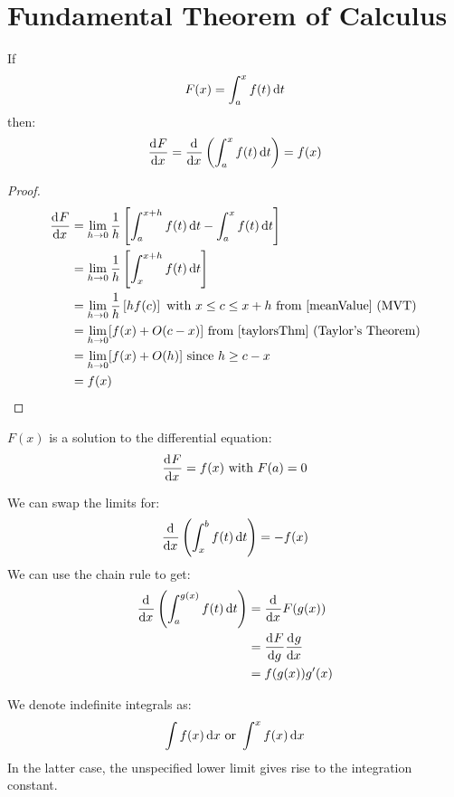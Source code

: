 \documentclass[../main.tex]{subfiles}
\begin{document}
\section{Fundamental Theorem of Calculus}
\begin{theorem}
  If
  \[
    F(x) = \int_{a}^{x} f(t) \,\mathrm{d} t
  \]
  then:
  \[
    \deriv{F}{x} = \deriv{}{x}\left(\int_{a}^{x} f(t) \d{t}\right) = f(x)
  \]
\end{theorem}
\begin{proof}
  \begin{align*}
    \deriv{F}{x} &= \lim_{h \to 0} \frac{1}{h} \left[\int_{a}^{x+h} f(t) \d{t} - \int_{a}^{x} f(t) \d{t}\right] \\
                 &= \lim_{h \to 0} \frac{1}{h} \left[\int_{x}^{x+h} f(t) \d{t}\right] \\
                 &= \lim_{h \to 0} \frac{1}{h} \left[hf(c)\right] \text{ with } x \leq c \leq x + h \text{ from \cref{meanValue} (MVT)} \\
                 &= \lim_{h \to 0} [f(x) + O(c-x)] \text{ from \cref{taylorsThm} (Taylor's Theorem)} \\
                 &=\lim_{h \to 0} [f(x) + O(h)] \text{ since $h \geq c-x$} \\
                 &= f(x)
  \end{align*}
\end{proof}
\begin{remark}[Note]
  $F(x)$ is a solution to the differential equation:
  \[
    \deriv{F}{x} = f(x) \text{ with } F(a) = 0
  \]
\end{remark}
\begin{corollary}
  We can swap the limits for:
  \[
    \deriv{}{x}\left(\int_{x}^{b} f(t) \d{t}\right) = -f(x)
  \]
  We can use the chain rule to get:
  \begin{align*}
    \deriv{}{x}\left(\int_{a}^{g(x)} f(t) \d{t}\right) &= \deriv{}{x}F(g(x)) \\
                                            &= \deriv{F}{g} \deriv{g}{x} \\
                                            &= f(g(x)) g'(x)
  \end{align*}
\end{corollary}
\begin{remark}[Notation]
  We denote indefinite integrals as:
  \[
    \int f(x) \,\mathrm{d} x \text{ or } \int_{}^{x} f(x) \,\mathrm{d} x
  \]
  In the latter case, the unspecified lower limit gives rise to the integration constant.
\end{remark}
\end{document}
